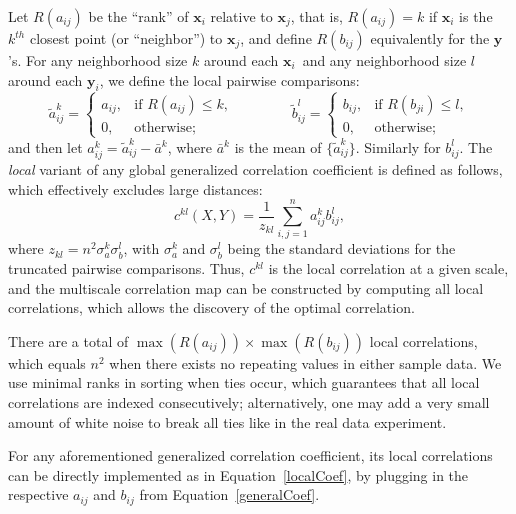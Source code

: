 \documentclass[11pt]{article}
\providecommand{\mt}[1]{\widetilde{#1}}
\providecommand{\mb}[1]{\boldsymbol{#1}}
\newcommand{\GG}{c}
\newcommand{\mby}{\ensuremath{\mb{y}}}
\begin{document}
Let $R(a_{ij})$  be the ``rank'' of $\mb{x}_i$ relative to $\mb{x}_j$, that is, $R(a_{ij})=k$ if $\mb{x}_i$ is the $k^{th}$ closest point (or ``neighbor'') to $\mb{x}_j$, and define $R(b_{ij})$ equivalently for the \mby's. For any neighborhood size $k$ around each $\mb{x}_i$~and any neighborhood size $l$ around each $\mb{y}_i$, we define the local pairwise comparisons:
\begin{equation}
\label{localCoef2}
    \mt{a}_{ij}^k=
    \begin{cases}
      a_{ij}, & \text{if } R(a_{ij}) \leq k, \\    
      0, & \text{otherwise};
    \end{cases} \qquad \qquad
    \mt{b}_{ij}^l=
    \begin{cases}
      b_{ij}, & \text{if } R(b_{ji}) \leq l, \\
      0, & \text{otherwise};
    \end{cases}
\end{equation}
and then let $a^k_{ij}=\mt{a}^k_{ij} - \bar{a}^k$, 
where $\bar{a}^k$ is the mean of $\{\mt{a}_{ij}^{k}\}$. Similarly for $b^l_{ij}$.
The \emph{local} variant of any global generalized correlation coefficient is defined as follows, which effectively excludes large distances:
\begin{equation}
\label{localCoef}
\GG^{kl}(X,Y)=\dfrac{1}{z_{kl}} {\textstyle \sum_{i,j=1}^n a_{ij}^k b_{ij}^l},
\end{equation}
where $z_{kl}=n^2 \sigma_a^k \sigma_b^l$,  with $\sigma_a^k$ and $\sigma_b^{l}$ being the standard deviations for the truncated pairwise comparisons. Thus, $c^{kl}$ is the local correlation at a given scale, and the multiscale correlation map can be constructed by computing all local correlations, which allows the discovery of the optimal correlation.

There are a total of $\max(R(a_{ij})) \times \max(R(b_{ij}))$ local correlations, which equals $n^2$ when there exists no repeating values in either sample data. We use minimal ranks in sorting when ties occur, which guarantees that all local correlations are indexed consecutively; alternatively, one may add a very small amount of white noise to break all ties like in the real data experiment.

For any aforementioned generalized correlation coefficient, its local correlations can be directly implemented as in Equation~\ref{localCoef}, by plugging in the respective $a_{ij}$ and $b_{ij}$ from Equation~\ref{generalCoef}. 
\end{document}
